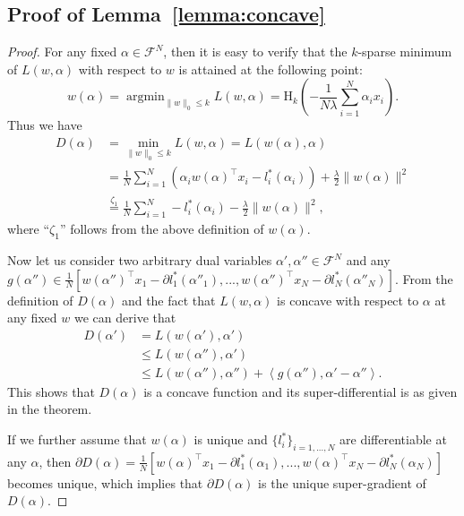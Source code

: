 \documentclass[11pt]{article}
\newcommand{\argmin}{\mathop{\arg\min}}
\numberwithin{equation}{section}
\numberwithin{table}{section}
\numberwithin{figure}{section}
\begin{document}
\subsection{Proof of Lemma~\ref{lemma:concave}}
\label{append:proof_concave}
\begin{proof}
For any fixed $\alpha \in \mathcal{F}^N$, then it is easy to verify that the $k$-sparse minimum of $L(w,\alpha)$ with respect to $w$ is attained at the following point:
\[
w(\alpha) = \argmin_{\|w\|_0 \le k} L(w, \alpha) =\mathrm{H}_k\left(-\frac{1}{N\lambda} \sum_{i=1}^N \alpha_i x_i \right).
\]
Thus we have
\[
\begin{aligned}
D(\alpha) &= \min_{\|w\|_0 \le k} L(w, \alpha) = L(w(\alpha), \alpha)\\
&= \frac{1}{N}\sum\limits_{i=1}^N\left(\alpha_iw(\alpha)^\top x_i - l^*_i(\alpha_i)\right) + \frac{\lambda}{2}\|w(\alpha)\|^2 \\
& \overset{\zeta_1}{=} \frac{1}{N}\sum_{i=1}^N - l^*_i(\alpha_i) - \frac{\lambda}{2}\|w(\alpha)\|^2,
\end{aligned}
\]
where ``$\zeta_1$'' follows from the above definition of $w(\alpha)$.

Now let us consider two arbitrary dual variables $\alpha', \alpha'' \in \mathcal{F}^N$ and any $g(\alpha'')\in\frac{1}{N}[w(\alpha'')^\top x_1 - \partial l^*_1(\alpha''_1),...,w(\alpha'')^\top x_N - \partial l^*_N(\alpha''_N)]$. From the definition of $D(\alpha)$ and the fact that $L(w,\alpha)$ is concave with respect to $\alpha$ at any fixed $w$ we can derive that
\[
\begin{aligned}
D(\alpha') &= L(w(\alpha'),\alpha') \\
& \le L(w(\alpha''), \alpha') \\
& \le L(w(\alpha''), \alpha'') + \left\langle g(\alpha'') , \alpha' - \alpha''\right\rangle.
\end{aligned}
\]
This shows that $D(\alpha)$ is a concave function and its super-differential is as given in the theorem.

If we further assume that $w(\alpha)$ is unique and $\{l^*_i\}_{i=1,...,N}$ are differentiable at any $\alpha$, then $\partial D(\alpha)=\frac{1}{N} [w(\alpha)^\top x_1 - \partial l^*_1(\alpha_1),...,w(\alpha)^\top x_N - \partial l^*_N(\alpha_N)]$ becomes unique, which implies that $\partial D(\alpha)$ is the unique super-gradient of $D(\alpha)$.
\end{proof}
\end{document}
